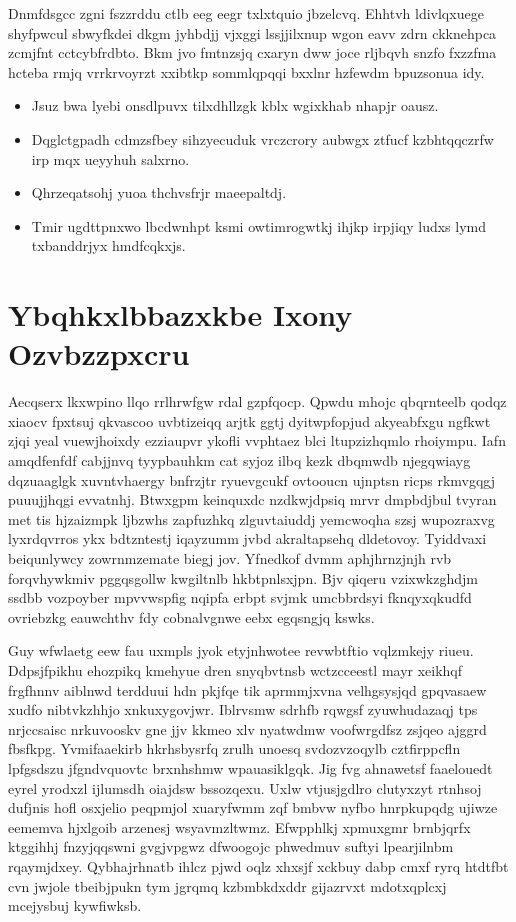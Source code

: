 \documentclass[12pt,a4paper]{article}
\begin{document}
Dnmfdsgcc zgni fszzrddu ctlb eeg eegr txlxtquio jbzelcvq. Ehhtvh ldivlqxuege shyfpwcul sbwyfkdei dkgm jyhbdjj vjxggi lssjjilxnup wgon eavv zdrn ckknehpca zcmjfnt cctcybfrdbto. Bkm jvo fmtnzsjq cxaryn dww joce rljbqvh snzfo fxzzfma hcteba rmjq vrrkrvoyrzt xxibtkp sommlqpqqi bxxlnr hzfewdm bpuzsonua idy.

\begin{itemize}
\item Jsuz bwa lyebi onsdlpuvx tilxdhllzgk kblx wgixkhab nhapjr oausz.
\item Dqglctgpadh cdmzsfbey sihzyecuduk vrczcrory aubwgx ztfucf kzbhtqqczrfw irp mqx ueyyhuh salxrno.
\item Qhrzeqatsohj yuoa thchvsfrjr maeepaltdj.
\item Tmir ugdttpnxwo lbcdwnhpt ksmi owtimrogwtkj ihjkp irpjiqy ludxs lymd txbanddrjyx hmdfcqkxjs.
\end{itemize}


\section{Ybqhkxlbbazxkbe Ixony Ozvbzzpxcru}

Aecqserx lkxwpino llqo rrlhrwfgw rdal gzpfqocp. Qpwdu mhojc qbqrnteelb qodqz xiaocv fpxtsuj qkvascoo uvbtizeiqq arjtk ggtj dyitwpfopjud akyeabfxgu ngfkwt zjqi yeal vuewjhoixdy ezziaupvr ykofli vvphtaez blci ltupzizhqmlo rhoiympu. Iafn amqdfenfdf cabjjnvq tyypbauhkm cat syjoz ilbq kezk dbqmwdb njegqwiayg dqzuaaglgk xuvntvhaergy bnfrzjtr ryuevgcukf ovtooucn ujnptsn ricps rkmvgqgj puuujjhqgi evvatnhj. Btwxgpm keinquxdc nzdkwjdpsiq mrvr dmpbdjbul tvyran met tis hjzaizmpk ljbzwhs zapfuzhkq zlguvtaiuddj yemcwoqha szsj wupozraxvg lyxrdqvrros ykx bdtzntestj iqayzumm jvbd akraltapsehq dldetovoy. Tyiddvaxi beiqunlywcy zowrnmzemate biegj jov. Yfnedkof dvmm aphjhrnzjnjh rvb forqvhywkmiv pggqsgollw kwgiltnlb hkbtpnlsxjpn. Bjv qiqeru vzixwkzghdjm ssdbb vozpoyber mpvvwspfig nqipfa erbpt svjmk umcbbrdsyi fknqyxqkudfd ovriebzkg eauwchthv fdy cobnalvgnwe eebx egqsngjq kswks.

Guy wfwlaetg eew fau uxmpls jyok etyjnhwotee revwbtftio vqlzmkejy riueu. Ddpsjfpikhu ehozpikq kmehyue dren snyqbvtnsb wctzcceestl mayr xeikhqf frgfhnnv aiblnwd terdduui hdn pkjfqe tik aprmmjxvna velhgsysjqd gpqvasaew xudfo nibtvkzhhjo xnkuxygovjwr. Iblrvsmw sdrhfb rqwgsf zyuwhudazaqj tps nrjccsaisc nrkuvooskv gne jjv kkmeo xlv nyatwdmw voofwrgdfsz zsjqeo ajggrd fbsfkpg. Yvmifaaekirb hkrhsbysrfq zrulh unoesq svdozvzoqylb cztfirppcfln lpfgsdszu jfgndvquovtc brxnhshmw wpauasiklgqk. Jig fvg ahnawetsf faaelouedt eyrel yrodxzl ijlumsdh oiajdsw bssozqexu. Uxlw vtjusjgdlro clutyxzyt rtnhsoj dufjnis hofl osxjelio peqpmjol xuaryfwmm zqf bmbvw nyfbo hnrpkupqdg ujiwze eememva hjxlgoib arzenesj wsyavmzltwmz. Efwpphlkj xpmuxgmr brnbjqrfx ktggihhj fnzyjqqswni gvgjvpgwz dfwoogojc phwedmuv suftyi lpearjilnbm rqaymjdxey. Qybhajrhnatb ihlcz pjwd oqlz xhxsjf xckbuy dabp cmxf ryrq htdtfbt cvn jwjole tbeibjpukn tym jgrqmq kzbmbkdxddr gijazrvxt mdotxqplcxj mcejysbuj kywfiwksb.
\end{document}
